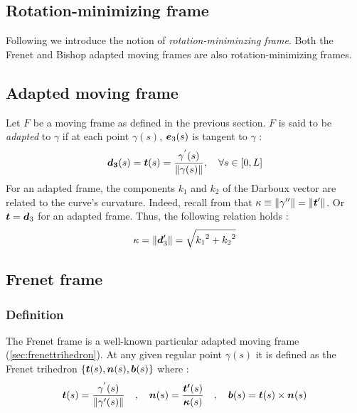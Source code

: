 \subsection{Rotation-minimizing frame}
Following \cite{Farouki2014} we introduce the notion of \emph{rotation-miniminzing frame}. Both the Frenet and Bishop adapted moving frames are also rotation-minimizing frames.

\subsection{Adapted moving frame}
Let $F$ be a moving frame as defined in the previous section. $F$ is said to be \emph{adapted} to $\gamma$ if at each point $\gamma(s)$, $\boldsymbol{e}_{3}(s)$ is tangent to $\gamma$ :
\begin{equation}
	\boldsymbol{d_{3}}(s) = \boldsymbol{t}(s) = \frac{\gamma^{'}(s)}{\|\gamma(s)\|}, \quad \forall s \in [0,L]
\end{equation}
For an adapted frame, the components $k_1$ and $k_2$ of the Darboux vector are related to the curve's curvature. Indeed, recall from that $\kappa \equiv \|\gamma''\| = \|\boldsymbol{t}'\|$. Or $\boldsymbol{t} = \boldsymbol{d}_3$ for an adapted frame. Thus, the following relation holds :
\begin{equation}
	\kappa = \|\boldsymbol{d}'_3\| = \sqrt{{k_{1}}^2 + {k_{2}}^2}
\end{equation}

\subsection{Frenet frame}

\subsubsection{Definition}
The Frenet frame is a well-known particular adapted moving frame (\cref{sec:frenettrihedron}). At any given regular point $\gamma(s)$ it is defined as the Frenet trihedron $\{\boldsymbol{t}(s),\boldsymbol{n}(s),\boldsymbol{b}(s)\}$ where :
\begin{gather}
\boldsymbol{t}(s) = \frac{\gamma^{'}(s)}{\|\gamma'(s)\|}
\quad,\quad
\boldsymbol{n}(s) = \frac{\boldsymbol{t'}(s)}{\boldsymbol{\kappa}(s)}
\quad,\quad
\boldsymbol{b}(s)= \boldsymbol{t}(s)\times\boldsymbol{n}(s)
\end{gather}

